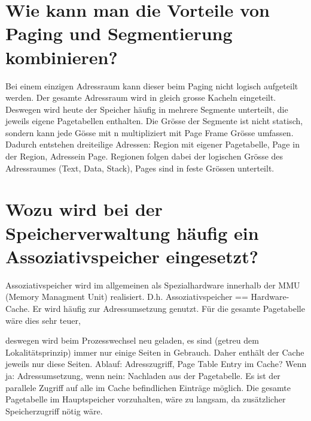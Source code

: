 \documentclass[12pt,a4paper,ngerman]{scrartcl}
\newcommand{\question}[1]{#1}
\newenvironment {answer}
                {}
                {}
\begin{document}
\section{\question{Wie kann man die Vorteile von Paging und Segmentierung kombinieren?}}
\begin{answer}
Bei einem einzigen Adressraum kann dieser beim Paging nicht logisch aufgeteilt werden. Der gesamte
Adressraum wird in gleich grosse Kacheln eingeteilt.
Deswegen wird heute der Speicher häufig in mehrere Segmente unterteilt, die jeweils eigene Pagetabellen
enthalten. Die Grösse der Segmente ist nicht statisch, sondern kann jede Gösse mit n
multipliziert mit Page Frame Grösse umfassen.
Dadurch entstehen dreiteilige Adressen:
Region mit eigener Pagetabelle, Page in der Region, Adressein Page.
Regionen folgen dabei der logischen Grösse des Adressraumes (Text, Data, Stack), Pages sind in
feste Grössen unterteilt.
\end{answer}

\section{\question{Wozu wird bei der Speicherverwaltung häufig ein Assoziativspeicher eingesetzt?}}
\begin{answer}
Assoziativspeicher wird im allgemeinen als Spezialhardware innerhalb der MMU (Memory Managment
Unit) realisiert. D.h. Assoziativspeicher == Hardware-Cache.
Er wird häufig zur Adressumsetzung genutzt. Für die gesamte Pagetabelle wäre dies sehr teuer,

deswegen wird beim Prozesswechsel neu geladen, es sind (getreu dem Lokalitätsprinzip) immer nur
einige Seiten in Gebrauch. Daher enthält der Cache jeweils nur diese Seiten. Ablauf: Adresszugriff,
Page Table Entry im Cache? Wenn ja: Adressumsetzung, wenn nein: Nachladen aus der Pagetabelle.
Es ist der parallele Zugriff auf alle im Cache befindlichen Einträge möglich. Die gesamte Pagetabelle
im Hauptspeicher vorzuhalten, wäre zu langsam, da zusätzlicher Speicherzugriff nötig
wäre.
\end{answer}
\end{document}
